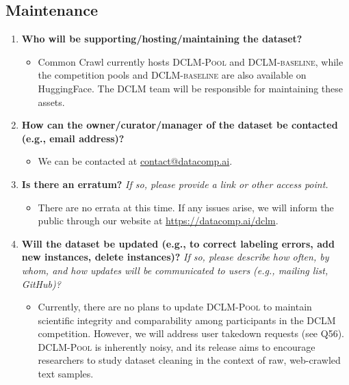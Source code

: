 \documentclass{article}
\makeatletter
\newcommand{\dclm}{\textsc{DCLM}\xspace}
\newcommand{\rawpool}{\textsc{DCLM-Pool}\xspace}
\newcommand{\hqpool}{\textsc{DCLM-baseline}\xspace}
\newcommand{\ourcode}{\url{https://datacomp.ai/dclm}\xspace}  %
\newcommand{\contactus}{\url{contact@datacomp.ai}\xspace}
\makeatother
\begin{document}
\subsection{Maintenance}

\begin{enumerate}[label=Q\arabic*, resume]

\item \textbf{Who will be supporting/hosting/maintaining the dataset?}

\begin{itemize}
\item Common Crawl currently hosts \rawpool and \hqpool, while the competition pools and \hqpool are also available on HuggingFace. The \dclm team will be responsible for maintaining these assets.
\end{itemize}

\item \textbf{How can the owner/curator/manager of the dataset be contacted (e.g., email address)?}


\begin{itemize}
\item We can be contacted at \contactus.
\end{itemize}

\item \textbf{Is there an erratum?} \textit{If so, please provide a link or other access point.}


\begin{itemize}
\item There are no errata at this time. If any issues arise, we will inform the public through our website at \ourcode.
\end{itemize}

\item \textbf{Will the dataset be updated (e.g., to correct labeling errors, add new instances, delete instances)?} \textit{If so, please describe how often, by whom, and how updates will be communicated to users (e.g., mailing list, GitHub)?}

\begin{itemize}
\item Currently, there are no plans to update \rawpool to maintain scientific integrity and comparability among participants in the \dclm competition. However, we will address user takedown requests (see Q56). \rawpool is inherently noisy, and its release aims to encourage researchers to study dataset cleaning in the context of raw, web-crawled text samples.
\end{itemize}


\end{enumerate}
\end{document}
